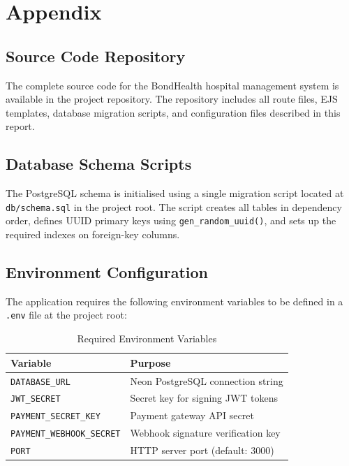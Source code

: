 \appendix
\chapter{Appendix}
\label{ch:appendix}

\section{Source Code Repository}

The complete source code for the BondHealth hospital management system is available in the project repository. The repository includes all route files, EJS templates, database migration scripts, and configuration files described in this report.

\section{Database Schema Scripts}

The PostgreSQL schema is initialised using a single migration script located at \texttt{db/schema.sql} in the project root. The script creates all tables in dependency order, defines UUID primary keys using \texttt{gen\_random\_uuid()}, and sets up the required indexes on foreign-key columns.

\section{Environment Configuration}

The application requires the following environment variables to be defined in a \texttt{.env} file at the project root:

\begin{table}[ht]
\centering
\begin{tabular}{|ll|}
\hline
\textbf{Variable} & \textbf{Purpose} \\
\hline
\texttt{DATABASE\_URL} & Neon PostgreSQL connection string \\
\texttt{JWT\_SECRET} & Secret key for signing JWT tokens \\
\texttt{PAYMENT\_SECRET\_KEY} & Payment gateway API secret \\
\texttt{PAYMENT\_WEBHOOK\_SECRET} & Webhook signature verification key \\
\texttt{PORT} & HTTP server port (default: 3000) \\
\hline
\end{tabular}
\caption{Required Environment Variables}
\label{tab:env-vars}
\end{table}
